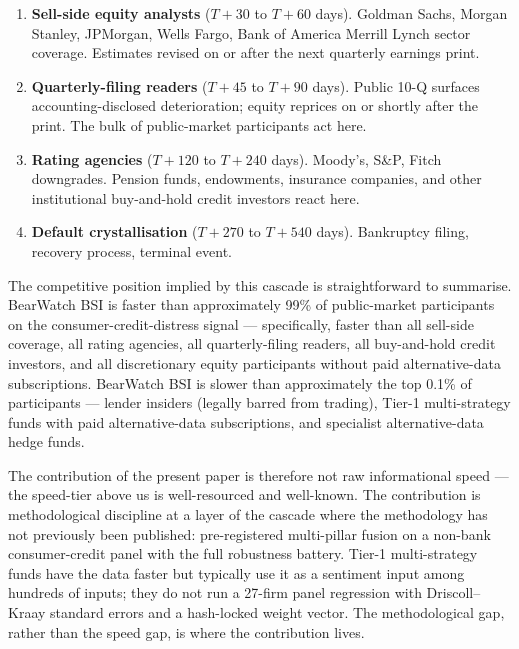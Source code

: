 \documentclass[11pt,a4paper]{article}
\begin{document}
\begin{enumerate}
\item \textbf{Sell-side equity analysts} ($T + 30$ to $T + 60$ days). Goldman Sachs, Morgan Stanley, JPMorgan, Wells Fargo, Bank of America Merrill Lynch sector coverage. Estimates revised on or after the next quarterly earnings print.

\item \textbf{Quarterly-filing readers} ($T + 45$ to $T + 90$ days). Public 10-Q surfaces accounting-disclosed deterioration; equity reprices on or shortly after the print. The bulk of public-market participants act here.

\item \textbf{Rating agencies} ($T + 120$ to $T + 240$ days). Moody's, S\&P, Fitch downgrades. Pension funds, endowments, insurance companies, and other institutional buy-and-hold credit investors react here.

\item \textbf{Default crystallisation} ($T + 270$ to $T + 540$ days). Bankruptcy filing, recovery process, terminal event.
\end{enumerate}

The competitive position implied by this cascade is straightforward to summarise. BearWatch BSI is faster than approximately 99\% of public-market participants on the consumer-credit-distress signal --- specifically, faster than all sell-side coverage, all rating agencies, all quarterly-filing readers, all buy-and-hold credit investors, and all discretionary equity participants without paid alternative-data subscriptions. BearWatch BSI is slower than approximately the top 0.1\% of participants --- lender insiders (legally barred from trading), Tier-1 multi-strategy funds with paid alternative-data subscriptions, and specialist alternative-data hedge funds.

The contribution of the present paper is therefore not raw informational speed --- the speed-tier above us is well-resourced and well-known. The contribution is methodological discipline at a layer of the cascade where the methodology has not previously been published: pre-registered multi-pillar fusion on a non-bank consumer-credit panel with the full robustness battery. Tier-1 multi-strategy funds have the data faster but typically use it as a sentiment input among hundreds of inputs; they do not run a 27-firm panel regression with Driscoll--Kraay standard errors and a hash-locked weight vector. The methodological gap, rather than the speed gap, is where the contribution lives.
\end{document}

